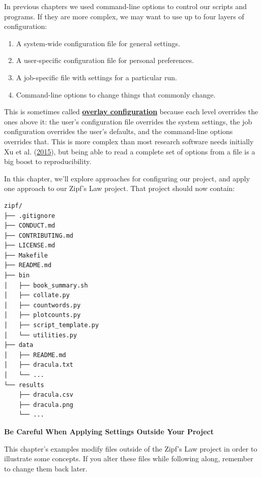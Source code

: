 \documentclass[
]{krantz}
\providecommand{\tightlist}{%
  \setlength{\itemsep}{0pt}\setlength{\parskip}{0pt}}
\renewenvironment{quote}{\begin{VF}}{\end{VF}}
\newcommand{\gref}[2]{\hyperlink{#2}{\textbf{#1}}}
\begin{document}
In previous chapters we used command-line options to control our scripts and programs.
If they are more complex,
we may want to use up to four layers of configuration:

\begin{enumerate}
\def\labelenumi{\arabic{enumi}.}
\tightlist
\item
  A system-wide configuration file for general settings.
\item
  A user-specific configuration file for personal preferences.
\item
  A job-specific file with settings for a particular run.
\item
  Command-line options to change things that commonly change.
\end{enumerate}

This is sometimes called \gref{overlay configuration}{overlay\_configuration}
because each level overrides the ones above it:
the user's configuration file overrides the system settings,
the job configuration overrides the user's defaults,
and the command-line options overrides that.
This is more complex than most research software needs initially Xu et al. (\protect\hyperlink{ref-Xu2015}{2015}),
but being able to read a complete set of options from a file
is a big boost to reproducibility.

In this chapter,
we'll explore approaches for configuring our project,
and apply one approach to our Zipf's Law project.
That project should now contain:

\begin{verbatim}
zipf/
├── .gitignore
├── CONDUCT.md
├── CONTRIBUTING.md
├── LICENSE.md
├── Makefile
├── README.md
├── bin
│   ├── book_summary.sh
│   ├── collate.py
│   ├── countwords.py
│   ├── plotcounts.py
│   ├── script_template.py
│   └── utilities.py
├── data
│   ├── README.md
│   ├── dracula.txt
│   └── ...
└── results
    ├── dracula.csv
    ├── dracula.png
    └── ...
\end{verbatim}

\begin{quote}
\textbf{Be Careful When Applying Settings Outside Your Project}

This chapter's examples modify files outside of the Zipf's Law project
in order to illustrate some concepts.
If you alter these files while following along,
remember to change them back later.
\end{quote}
\end{document}
